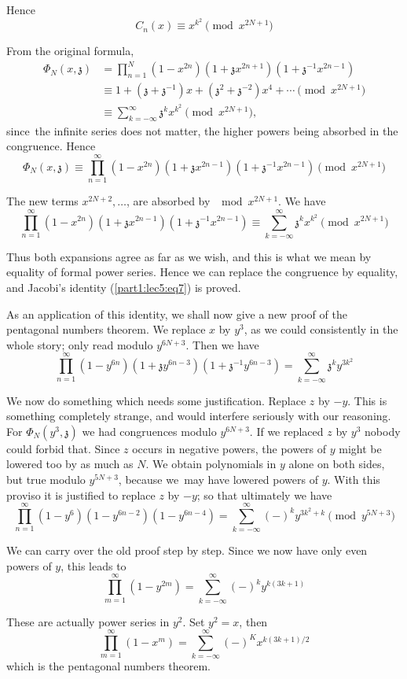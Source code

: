 Hence 
\begin{equation*}
  C_n (x) \equiv x^{k^2} \pmod{x^{2N+1}} \tag{9}\label{part1:lec5:eq9}
\end{equation*}

From the original formula,
\begin{align*}
  \Phi_N (x, \mathfrak{z})& = \prod^N_{n=1} (1-x^{2n})
  (1+\mathfrak{z}x^{2n+1})(1+\mathfrak{z}^{-1} x^{2n-1})\\
  & \equiv 1+ (\mathfrak{z}+\mathfrak{z}^{-1}) x+ (\mathfrak{z}^2 +
  \mathfrak{z}^{-2}) x^4 + \cdots \pmod{x^{2N+1}}\\
  & \equiv \sum^\infty_{k=-\infty} \mathfrak{z}^k x^{k^2} \pmod{x^{2N+1}},
\end{align*}
since\pageoriginale\  the infinite series does not matter, the higher powers being
absorbed in the congruence. Hence
$$
\Phi_N (x, \mathfrak{z}) \equiv \prod^\infty_{n=1} (1-x^{2n})
(1+\mathfrak{z}x^{2n-1})(1+\mathfrak{z}^{-1} x^{2n-1}) \pmod{x^{2N+1}}
$$

The new terms $x^{2N+2}, \ldots$, are absorbed by $\mod x^{2N+1}$. We
have
$$
\prod^\infty_{n=1}
(1-x^{2n})(1+\mathfrak{z}x^{2n-1})(1+\mathfrak{z}^{-1} x^{2n-1})
\equiv \sum^\infty_{k=-\infty} \mathfrak{z}^k x^{k^2} \pmod{x^{2N+1}}
$$

Thus both expansions agree as far as we wish, and this is what we mean
by equality of formal power series. Hence we can replace the
congruence by equality, and Jacobi's identity (\ref{part1:lec5:eq7}) is proved. 

As an application of this identity, we shall now give a new proof of
the pentagonal numbers theorem. We replace $x$ by $y^3$, as we could
consistently in the whole story; only read modulo $y^{6N+3}$. Then we
have
$$
\prod^\infty_{n=1}
(1-y^{6n})(1+\mathfrak{z}y^{6n-3})(1+\mathfrak{z}^{-1}y^{6n-3})
=\sum^\infty_{k=-\infty} \mathfrak{z}^k y^{3k^2}
$$

We now do something which needs some justification. Replace $z$ by
$-y$. This is something completely strange, and would interfere
seriously with our reasoning. For $\Phi_N (y^3, \mathfrak{z})$ we had
congruences modulo $y^{6N+3}$. If we replaced $z$ by $y^3$ nobody
could forbid that. Since $z$ occurs in negative powers, the powers of
$y$ might be lowered too by as much as $N$. We obtain polynomials in
$y$ alone on both sides, but true modulo $y^{5N+3}$, because we\pageoriginale\  may
have lowered powers of $y$. With this proviso it is justified to
replace $z$ by $-y$; so that ultimately we have
$$
\prod^\infty_{n=1} (1-y^6)(1-y^{6n-2}) (1-y^{6n-4})= 
\sum^\infty_{k=-\infty} (-)^k y^{3k^2+k} \pmod{y^{5N+3}}
$$

We can carry over the old proof step by step. Since we now have only
even powers of $y$, this leads to
$$
\prod^\infty_{m=1} (1-y^{2m})= \sum^\infty_{k=-\infty} (-)^k y^{k(3k+1)}
$$

These are actually power series in $y^2$. Set $y^2=x$, then
$$
\prod^\infty_{m=1} (1-x^m) = \sum^\infty_{k=-\infty} (-)^K x^{k(3k+1)/2}
$$
which is the pentagonal numbers theorem.

